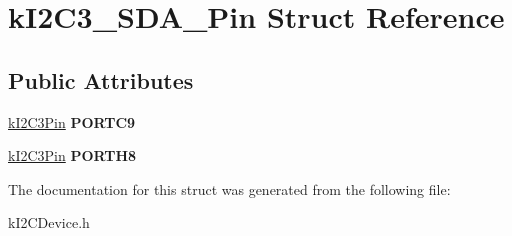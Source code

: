 \hypertarget{structkI2C3__SDA__Pin}{}\section{k\+I2\+C3\+\_\+\+S\+D\+A\+\_\+\+Pin Struct Reference}
\label{structkI2C3__SDA__Pin}
\subsection*{Public Attributes}
\begin{DoxyCompactItemize}
\item 
\hyperlink{structkI2C3Pin}{k\+I2\+C3\+Pin} {\bfseries P\+O\+R\+T\+C9}\hypertarget{structkI2C3__SDA__Pin_a2604936300310d9b0b7c5058bd375e11}{}\label{structkI2C3__SDA__Pin_a2604936300310d9b0b7c5058bd375e11}

\item 
\hyperlink{structkI2C3Pin}{k\+I2\+C3\+Pin} {\bfseries P\+O\+R\+T\+H8}\hypertarget{structkI2C3__SDA__Pin_ab7d36d0237fbc10b02631067f9f8d382}{}\label{structkI2C3__SDA__Pin_ab7d36d0237fbc10b02631067f9f8d382}

\end{DoxyCompactItemize}


The documentation for this struct was generated from the following file\+:\begin{DoxyCompactItemize}
\item 
k\+I2\+C\+Device.\+h\end{DoxyCompactItemize}
